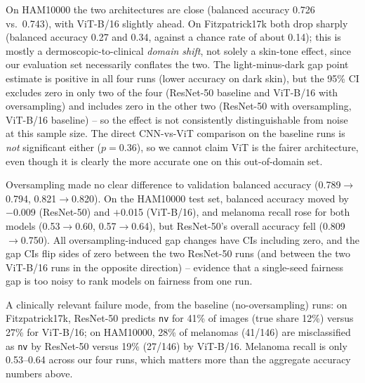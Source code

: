 \documentclass[twoside,a4paper,11pt]{article}
\begin{document}
On HAM10000 the two architectures are close (balanced accuracy 0.726
vs.\ 0.743), with ViT-B/16 slightly ahead. On Fitzpatrick17k both drop
sharply (balanced accuracy 0.27 and 0.34, against a chance rate of
about 0.14); this is mostly a dermoscopic-to-clinical \emph{domain
shift}, not solely a skin-tone effect, since our evaluation set
necessarily conflates the two. The light-minus-dark gap point estimate
is positive in all four runs (lower accuracy on dark skin), but the
95\% CI excludes zero in only two of the four (ResNet-50 baseline and
ViT-B/16 with oversampling) and includes zero in the other two
(ResNet-50 with oversampling, ViT-B/16 baseline) -- so the effect is
not consistently distinguishable from noise at this sample size. The
direct CNN-vs-ViT comparison on the baseline runs is \emph{not}
significant either ($p=0.36$), so we cannot claim ViT is the fairer
architecture, even though it is clearly the more accurate one on this
out-of-domain set.

Oversampling made no clear difference to validation balanced accuracy
(0.789$\to$0.794, 0.821$\to$0.820). On the HAM10000 test set, balanced
accuracy moved by $-$0.009 (ResNet-50) and $+$0.015 (ViT-B/16), and
melanoma recall rose for both models (0.53$\to$0.60, 0.57$\to$0.64),
but ResNet-50's overall accuracy fell (0.809$\to$0.750). All
oversampling-induced gap changes have CIs including zero, and the gap
CIs flip sides of zero between the two ResNet-50 runs (and between the
two ViT-B/16 runs in the opposite direction) -- evidence that a
single-seed fairness gap is too noisy to rank models on fairness from
one run.

A clinically relevant failure mode, from the baseline (no-oversampling)
runs: on Fitzpatrick17k, ResNet-50 predicts \texttt{nv} for 41\% of
images (true share 12\%) versus 27\% for ViT-B/16; on HAM10000, 28\% of
melanomas (41/146) are misclassified as \texttt{nv} by ResNet-50 versus
19\% (27/146) by ViT-B/16. Melanoma recall is only 0.53--0.64 across
our four runs, which matters more than the aggregate accuracy numbers
above.
\end{document}
